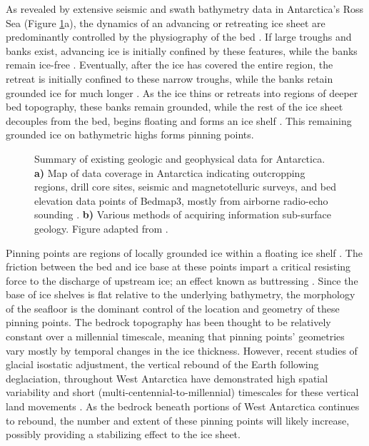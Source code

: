 As revealed by extensive seismic and swath bathymetry data in Antarctica's Ross Sea (Figure \ref{fig:chp1_data_coverage}a), the dynamics of an advancing or retreating ice sheet are predominantly controlled by the physiography of the bed \citep{halberstadticesheet2016, andersonseismic2019}. If large troughs and banks exist, advancing ice is initially confined by these features, while the banks remain ice-free \citep{andersonross2014}. Eventually, after the ice has covered the entire region, the retreat is initially confined to these narrow troughs, while the banks retain grounded ice for much longer \citep{andersonseismic2019, halberstadticesheet2016}. As the ice thins or retreats into regions of deeper bed topography, these banks remain grounded, while the rest of the ice sheet decouples from the bed, begins floating and forms an ice shelf \citep{shipplate1999}. This remaining grounded ice on bathymetric highs forms pinning points. \\

\begin{figure}[!ht]
    \centering
    
    \caption[Summary of existing geologic and geophysical data for Antarctica]{Summary of existing geologic and geophysical data for Antarctica. \textbf{a)} Map of data coverage in Antarctica indicating outcropping regions, drill core sites, seismic and  magnetotelluric surveys, and bed elevation data points of Bedmap3, mostly from airborne radio-echo sounding \citep{frémandantarctic2022}. \textbf{b)} Various methods of acquiring information sub-surface geology. Figure adapted from \citet{aitkenantarctica2023}.}
    \label{fig:chp1_data_coverage}
\end{figure}

Pinning points are regions of locally grounded ice within a floating ice shelf \citep{matsuokaantarctic2015}. The friction between the bed and ice base at these points impart a critical resisting force to the discharge of upstream ice; an effect known as buttressing \citep{thomasice1979, dupontassessment2005}. Since the base of ice shelves is flat relative to the underlying bathymetry, the morphology of the seafloor is the dominant control of the location and geometry of these pinning points. The bedrock topography has been thought to be relatively constant over a millennial timescale, meaning that pinning points' geometries vary mostly by temporal changes in the ice thickness. However, recent studies of glacial isostatic adjustment, the vertical rebound of the Earth following deglaciation, throughout West Antarctica have demonstrated high spatial variability and short (multi-centennial-to-millennial) timescales for these vertical land movements \citep{couloncontrasting2021, barlettaobserved2018, kachuckrapid2020}. As the bedrock beneath portions of West Antarctica continues to rebound, the number and extent of these pinning points will likely increase, possibly providing a stabilizing effect to the ice sheet. \\

